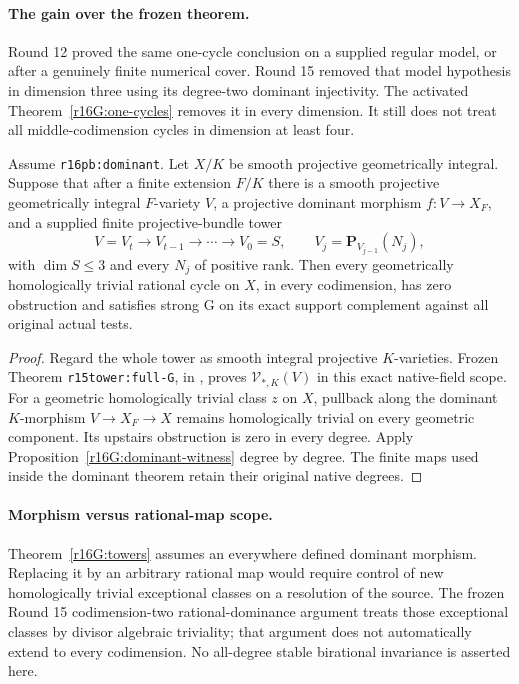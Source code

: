 \paragraph{The gain over the frozen theorem.}
Round 12 proved the same one-cycle conclusion on a
supplied regular model, or after a genuinely finite
numerical cover.  Round 15 removed that model hypothesis
in dimension three using its degree-two dominant
injectivity.  The activated Theorem~\ref{r16G:one-cycles}
removes it in every dimension.  It still does not treat
all middle-codimension cycles in dimension at least four.

\begin{theorem}
\label{r16G:towers}
Assume \texttt{r16pb:dominant}.  Let $X/K$ be smooth
projective geometrically integral.  Suppose that after a
finite extension $F/K$ there is a smooth projective
geometrically integral $F$-variety $V$, a projective
dominant morphism $f:V\to X_F$, and a supplied finite
projective-bundle tower
\[
 V=V_t\longrightarrow V_{t-1}\longrightarrow\cdots
             \longrightarrow V_0=S,
            \qquad V_j=\mathbf P_{V_{j-1}}(N_j),
\tag{GC16.7}\label{r16G:tower}
\]
with $\dim S\leq3$ and every $N_j$ of positive rank.
Then every geometrically homologically trivial rational
cycle on $X$, in every codimension, has zero obstruction
and satisfies strong G on its exact support complement
against all original actual tests.
\end{theorem}

\begin{proof}
Regard the whole tower as smooth integral projective
$K$-varieties.  Frozen Theorem \texttt{r15tower:full-G},
in ,
proves $\mathcal V_{*,K}(V)$ in this exact native-field
scope.  For a geometric homologically trivial class $z$
on $X$, pullback along the dominant $K$-morphism
$V\to X_F\to X$ remains homologically trivial on every
geometric component.  Its upstairs obstruction is zero
in every degree.  Apply
Proposition~\ref{r16G:dominant-witness} degree by degree.
The finite maps used inside the dominant theorem retain
their original native degrees.
\end{proof}

\paragraph{Morphism versus rational-map scope.}
Theorem~\ref{r16G:towers} assumes an everywhere defined
dominant morphism.  Replacing it by an arbitrary rational
map would require control of new homologically trivial
exceptional classes on a resolution of the source.
The frozen Round 15 codimension-two rational-dominance
argument treats those exceptional classes by divisor
algebraic triviality; that argument does not automatically
extend to every codimension.  No all-degree stable
birational invariance is asserted here.

